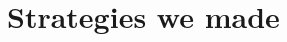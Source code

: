 \documentclass[12pt, a4paper]{article}
\begin{document}


\section{Strategies we made}
\end{document}
